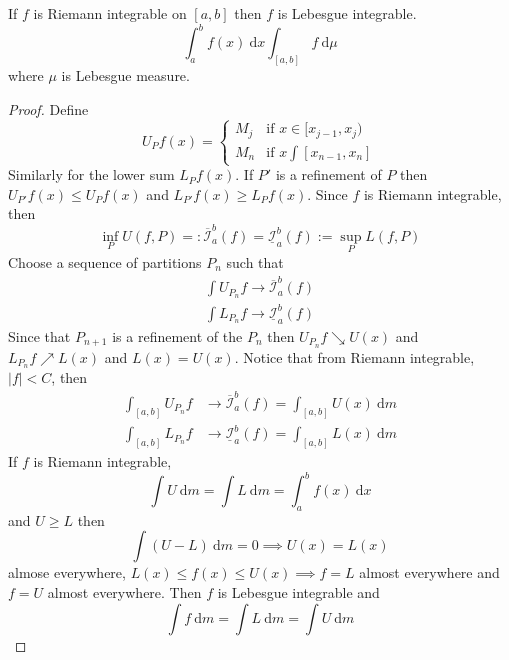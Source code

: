 \begin{theorem}
  If $f$ is Riemann integrable on $[a, b]$ then $f$ is Lebesgue integrable.
  \[\int_a^b f(x)\ \mathrm{d}x \int_{[a, b]}f \ \mathrm{d}\mu\]
  where $\mu$ is Lebesgue measure.
\end{theorem}

\begin{proof}
  Define
  \[U_Pf(x) = \begin{cases}
    M_j & \text{if } x \in [x_{j-1}, x_j) \\
    M_n & \text{if } x \int [x_{n-1}, x_n]
  \end{cases}\]
  Similarly for the lower sum $L_Pf(x)$. 
  If $P'$ is a refinement of $P$ then $U_{P'}f(x) \le U_Pf(x)$ and $L_{P'}f(x) \ge L_Pf(x)$.
  Since $f$ is Riemann integrable, then
  \[\inf_P U(f, P) =: \overline{\mathcal{I}}_a^b(f) = \underline{\mathcal{I}}_a^b(f) := \sup_P L(f, P)\]
  Choose a sequence of partitions $P_n$ such that
  \begin{align*}
    \int U_{P_n}f \to \overline{\mathcal{I}}_a^b(f) \\
    \int L_{P_n}f \to \underline{\mathcal{I}}_a^b(f)
  \end{align*}
  Since that $P_{n+1}$ is a refinement of the $P_n$ then $U_{P_n}f \searrow U(x)$ and 
  $L_{P_n}f \nearrow L(x)$ and $L(x) = U(x)$.
  Notice that from Riemann integrable, $|f| < C$, then
  \begin{align*}
    \int_{[a, b]} U_{P_n}f &\to \overline{\mathcal{I}}_a^b(f) = \int_{[a, b]} U(x)\ \mathrm{d}m\\
    \int_{[a, b]} L_{P_n}f &\to \underline{\mathcal{I}}_a^b(f) =\int_{[a, b]} L(x)\ \mathrm{d}m
  \end{align*}
  If $f$ is Riemann integrable, 
  \[\int U \ \mathrm{d}m = \int L \ \mathrm{d}m = \int_a^b f(x) \ \mathrm{d}x\]
  and $U \ge L$ then
  \[\int (U-L)\ \mathrm{d}m = 0 \implies U(x) = L(x)\]
  almose everywhere, $L(x) \le f(x) \le U(x) \implies f = L$ almost everywhere and $f = U$ almost everywhere.
  Then $f$ is Lebesgue integrable and
  \[\int f \ \mathrm{d}m = \int L \ \mathrm{d}m = \int U \ \mathrm{d}m\]
\end{proof}